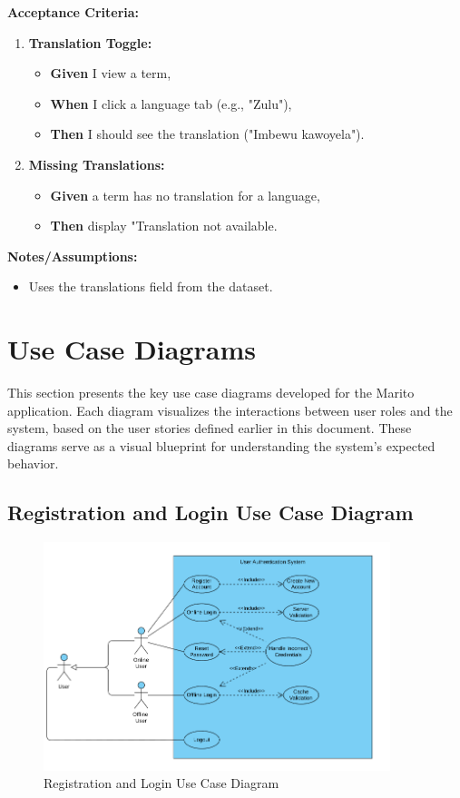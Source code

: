 \documentclass[12pt]{article}
\begin{document}
\vspace{1em}
\textbf{Acceptance Criteria:}
\begin{enumerate}
\item \textbf{Translation Toggle:}
\begin{itemize}
\item \textbf{Given} I view a term,
\item \textbf{When} I click a language tab (e.g., "Zulu"),
\item \textbf{Then} I should see the translation ("Imbewu kawoyela").
\end{itemize}

\item \textbf{Missing Translations:}
\begin{itemize}
    \item \textbf{Given} a term has no translation for a language,
    \item \textbf{Then} display "Translation not available.
\end{itemize}
\end{enumerate}

\vspace{1em}
\textbf{Notes/Assumptions:}
\begin{itemize}
\item Uses the translations field from the dataset.
\end{itemize}

\section{Use Case Diagrams}

This section presents the key use case diagrams developed for the Marito application. Each diagram visualizes the interactions between user roles and the system, based on the user stories defined earlier in this document. These diagrams serve as a visual blueprint for understanding the system's expected behavior.

\subsection{Registration and Login Use Case Diagram}
\begin{figure}[H]
  \centering
  \includegraphics[width=0.9\textwidth]{registration_login.png}
  \caption{Registration and Login Use Case Diagram}
  \label{fig:reg-log-use-case}
\end{figure}
\end{document}
